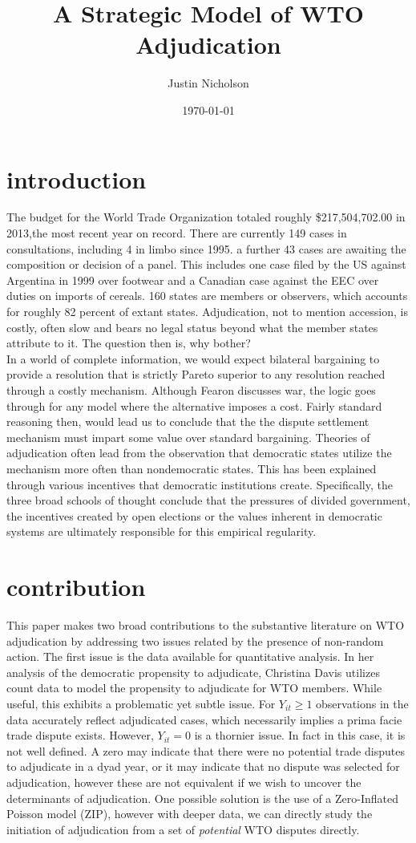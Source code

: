 \documentclass[]{article}
\author{Justin Nicholson}
\date{\today}
\title{A Strategic Model of WTO Adjudication}
\begin{document}
\section{introduction}
The budget for the World Trade Organization totaled roughly \$217,504,702.00 in 2013,the most recent year on record. There are currently 149 cases in consultations, including 4 in limbo since 1995. a further 43 cases are awaiting the composition or decision of a panel. This includes one case filed by the US against Argentina in 1999 over footwear and a Canadian case against the EEC over duties on imports of cereals. 160 states are members or observers, which accounts for roughly 82 percent of extant states. Adjudication, not to mention accession, is costly, often slow and bears no legal status beyond what the member states attribute to it. The question then is, why bother?  \\

In a world of complete information, we would expect bilateral bargaining to provide a resolution that is strictly Pareto superior to any resolution reached through a costly mechanism. Although Fearon discusses war, the logic goes through for any model where the alternative imposes a cost. Fairly standard reasoning then, would lead us to conclude that the the dispute settlement mechanism must impart some value over standard bargaining. Theories of adjudication often lead from the observation that democratic states utilize the mechanism more often than nondemocratic states. This has been explained through various incentives that democratic institutions create. Specifically, the three broad schools of thought conclude that the pressures of divided government, the incentives created by open elections or the values inherent in democratic systems are ultimately responsible for this empirical regularity. \\
 
\section{contribution}
This paper makes two broad contributions to the substantive literature on WTO adjudication by addressing two issues related by the presence of non-random action. The first issue is the data available for quantitative analysis. In her analysis of the democratic propensity to adjudicate, Christina Davis utilizes count data to model the propensity to adjudicate for WTO members. While useful, this exhibits a problematic yet subtle issue.  For $Y_{it}\geq 1$ observations in the data accurately reflect adjudicated cases, which necessarily implies a prima facie trade dispute exists. However, $Y_{it} = 0$ is a thornier issue. In fact in this case, it is not well defined. A zero may indicate that there were no potential trade disputes to adjudicate in a dyad year, or it may indicate that no dispute was selected for adjudication, however these are not equivalent if we wish to uncover the determinants of adjudication. One possible solution is the use of a Zero-Inflated Poisson model (ZIP), however with deeper data, we can directly study the initiation of adjudication from a set of \textit{potential} WTO disputes directly. \\
\end{document}
